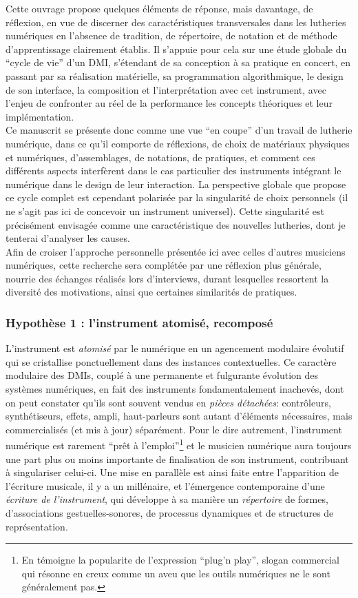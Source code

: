 \noindent Cette ouvrage propose quelques éléments de réponse, mais davantage, de réflexion, en vue de discerner des caractéristiques transversales dans les lutheries numériques en l'absence de tradition, de répertoire, de notation et de méthode d'apprentissage clairement établis. Il s'appuie pour cela sur une étude globale du ``cycle de vie'' d'un \gls{DMI}, s'étendant de sa conception à sa pratique en concert, en passant par sa réalisation matérielle, sa programmation algorithmique, le design de son interface, la composition et l'interprétation avec cet instrument, avec l'enjeu de confronter au réel de la performance les concepts théoriques et leur implémentation.\\
\indent Ce manuscrit se présente donc comme une vue ``en coupe'' d'un travail de lutherie numérique, dans ce qu'il comporte de réflexions, de choix de matériaux physiques et numériques, d'assemblages, de notations, de pratiques, et comment ces différents aspects interfèrent dans le cas particulier des instruments intégrant le numérique dans le design de leur interaction. La perspective globale que propose ce cycle complet est cependant polarisée par la singularité de choix personnels (il ne s'agit pas ici de concevoir un instrument universel). Cette singularité est précisément envisagée comme une caractéristique des nouvelles lutheries, dont je tenterai d'analyser les causes.\\
\indent Afin de croiser l'approche personnelle présentée ici avec celles d'autres musiciens numériques, cette recherche sera complétée par une réflexion plus générale, nourrie des échanges réalisés lors d'interviews, durant lesquelles ressortent la diversité des motivations, ainsi que certaines similarités de pratiques.

\subsubsection*{Hypothèse 1 : l'instrument atomisé, recomposé}

\noindent L'instrument est \textit{atomisé} par le numérique en un agencement modulaire évolutif qui se cristallise ponctuellement dans des instances contextuelles. Ce caractère modulaire des \glspl{DMI}, couplé à une permanente et fulgurante évolution des systèmes numériques, en fait des instruments fondamentalement inachevés, dont on peut constater qu'ils sont souvent vendus en \textit{pièces détachées}: contrôleurs, synthétiseurs, effets, ampli, haut-parleurs sont autant d'éléments nécessaires, mais commercialisés (et mis à jour) séparément. Pour le dire autrement, l'instrument numérique est rarement ``prêt à l'emploi''\footnote{En témoigne la popularite de l'expression ``plug'n play'', slogan commercial qui résonne en creux comme un aveu que les outils numériques ne le sont généralement pas.} et le musicien numérique aura toujours une part plus ou moins importante de finalisation de son instrument, contribuant à singulariser celui-ci. Une mise en parallèle est ainsi faite entre l'apparition de l'écriture musicale, il y a un millénaire, et l'émergence contemporaine d'une \textit{écriture de l'instrument}, qui développe à sa manière un \textit{répertoire} de formes, d'associations gestuelles-sonores, de processus dynamiques et de structures de représentation.

